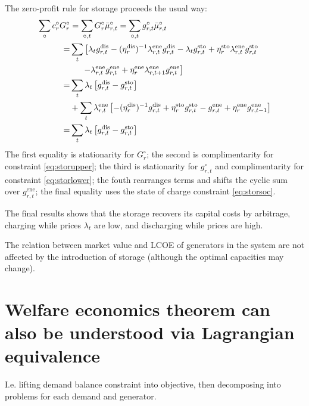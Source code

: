 \documentclass[final,3p,times]{elsarticle}
\def\l{\lambda}
\def\m{\mu}
\begin{document}
The zero-profit rule for storage proceeds the usual way:
\begin{align}
  \sum_\circ c^\circ_r G^\circ_r & =  \sum_{\circ,t} G^\circ_r\bar{\m}^\circ_{r,t}  =   \sum_{\circ,t} g^\circ_{r,t}\bar{\m}^\circ_{r,t} \nonumber \\
   = & \sum_t \left[ \l_t g^{\textrm{dis}}_{r,t} -(\eta^{\textrm{dis}}_r)^{-1} \l^{\textrm{ene}}_{r,t}  g^{\textrm{dis}}_{r,t}
  -\l_t g^{\textrm{sto}}_{r,t} + \eta^{\textrm{sto}}_r \l^{\textrm{ene}}_{r,t} g^{\textrm{sto}}_{r,t} \right.\nonumber \\
  & \left. \hspace{.5cm}-\l^{\textrm{ene}}_{r,t}g^{\textrm{ene}}_{r,t} + \eta^{\textrm{ene}}_r \l^{\textrm{ene}}_{r,t+1}g^{\textrm{ene}}_{r,t} \right] \nonumber \\
   = & \sum_t \l_t \left[ g^{\textrm{dis}}_{r,t} - g^{\textrm{sto}}_{r,t}  \right] \nonumber \\
   & + \sum_t  \l^{\textrm{ene}}_{r,t} \left[ -(\eta^{\textrm{dis}}_r)^{-1} g^{\textrm{dis}}_{r,t}+ \eta^{\textrm{sto}}_r  g^{\textrm{sto}}_{r,t} -g^{\textrm{ene}}_{r,t} + \eta^{\textrm{ene}}_r g^{\textrm{ene}}_{r,t-1} \right] \nonumber \\
      = & \sum_t \l_t \left[ g^{\textrm{dis}}_{r,t} - g^{\textrm{sto}}_{r,t}  \right]
\end{align}
The first equality is stationarity for $G^\circ_r$; the second is complimentarity for constraint \eqref{eq:storupper}; the third is stationarity for $g^\circ_{r,t}$ and complimentarity for constraint \eqref{eq:storlower}; the fouth rearranges terms and shifts the cyclic sum over $g^{\textrm{ene}}_{r,t}$; the final equality uses the state of charge constraint \eqref{eq:storsoc}.

The final results shows that the storage recovers its capital costs by arbitrage, charging while prices $\l_t$ are low, and discharging while prices are high.

The relation between market value and LCOE of generators in the system are not affected by the introduction of storage (although the optimal capacities may change).

\section{Welfare economics theorem can also be understood via Lagrangian equivalence}

I.e. lifting demand balance constraint into objective, then decomposing into problems for each demand and generator.




\end{document}
